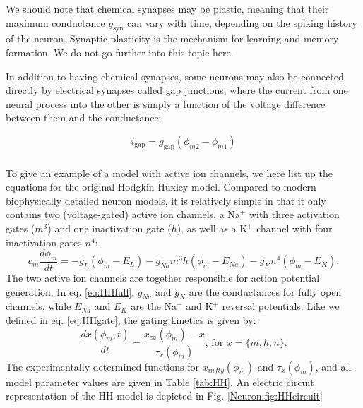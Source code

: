 We should note that chemical synapses may be plastic, meaning that their maximum conductance $\bar{g}_\text{syn}$ can vary with time, depending on the spiking history of the neuron. Synaptic plasticity is the mechanism for learning and memory formation. We do not go further into this topic here. 

In addition to having chemical synapses, some neurons may also be connected directly by electrical synapses called \underline{gap junctions}, where the current from one neural process into the other is simply a function of the voltage difference between them and the conductance: 

\begin{equation}
i_\text{gap}=g_\text{gap} (\phi_{m2}-\phi_{m1})
\label{eq:gapjunction}
\end{equation}


\subsubsection{}
To give an example of a model with active ion channels, we here list up the equations for the original Hodgkin-Huxley model. Compared to modern biophysically detailed neuron models, it is relatively simple in that it only contains two (voltage-gated) active ion channels, a Na$^+$ with three activation gates ($m^3$) and one inactivation gate ($h$), as well as a K$^+$ channel with four inactivation gates $n^4$:
\begin{equation}
c_m \frac{d\phi_m}{dt} = -\bar{g}_L(\phi_m-E_L) - \bar{g}_{Na} m^3 h (\phi_m - E_{Na}) - \bar{g}_{K} n^4 (\phi_m - E_{K}).
\label{eq:HHfull}
\end{equation}
The two active ion channels are together responsible for action potential generation. In eq. \ref{eq:HHfull}, $\bar{g}_{Na}$ and $\bar{g}_K$ are the conductances for fully open channels, while $E_{Na}$ and $E_{K}$ are the Na$^+$ and K$^+$ reversal potentials. Like we defined in eq. \ref{eq:HHgate}, the gating kinetics is given by: 
\begin{equation}
\frac{dx(\phi_m,t)}{dt} = \frac{x_{\infty}(\phi_m) - x}{\tau_x(\phi_m)},  \, \text{for } x = \{m,h,n\}.
\label{eq:HHgates}
\end{equation}
The experimentally determined functions for $x_{infty}(\phi_m)$ and $\tau_x(\phi_m)$, and all model parameter values are given in Table \ref{tab:HH}. An electric circuit representation of the HH model is depicted in Fig. \ref{Neuron:fig:HHcircuit}


